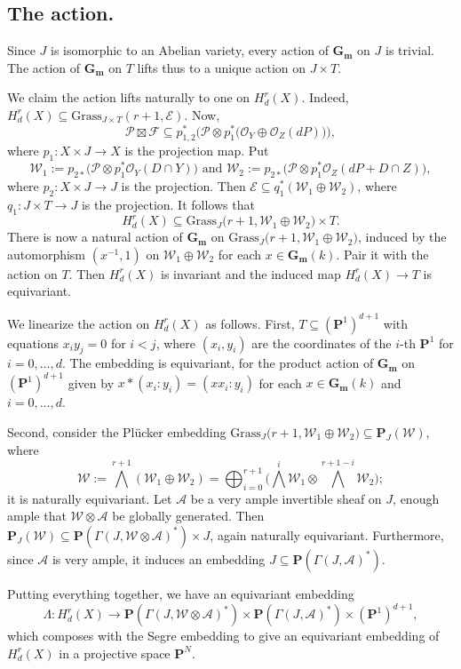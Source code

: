 \documentclass[a4paper,11pt]{amsart}
\theoremstyle{plain}
\theoremstyle{definition}
\theoremstyle{remark}
\def\cc{{\mathbf G}_{\mathbf m}}
\def\P{\mathcal{P}}
\def\W{\mathcal{W}}
\def\IP{{\mathbf P}}
\def\F{\mathcal{F}}
\def\E{\mathcal{E}}
\begin{document}
\subsection{The action.}\label{tG}

Since $J$ is isomorphic to an Abelian variety, every action of $\cc$ on $J$ is trivial. The action of $\cc$ on $T$ lifts thus to a unique action on $J\times T$. 

We claim the action lifts naturally
to one on $H^{r}_d(X)$. Indeed, $H^r_d(X)\subseteq \text{Grass}_{J\times T}(r+1,\E)$. Now,
$$
\P\boxtimes\F\subseteq p_{1,2}^*\Big(\P\otimes p_1^*\big(\mathcal O_Y\oplus\mathcal O_Z(dP)\big)\Big),
$$
where $p_1\colon X\times J\to X$ is the projection map. Put
$$
\W_1:=p_{2\ast}\big(\P\otimes p_1^*\mathcal O_Y(D\cap Y)\big)\text{ and }
\W_2:=p_{2\ast}\big(\P\otimes p_1^*\mathcal O_Z(dP+D\cap Z)\big),
$$
where $p_2\colon X\times J\to J$ is the projection. Then $\mathcal E\subseteq q_1^*(\W_1\oplus\W_2)$, where $q_1\colon J\times T\to J$ is the projection. It follows that 
$$
H^r_d(X)\subseteq \text{Grass}_{J}\big(r+1,\W_1\oplus\W_2\big)\times T.
$$
There is now a natural action of $\cc$ on $\text{Grass}_{J}\big(r+1,\W_1\oplus\W_2\big)$, induced by the automorphism $(x^{-1},1)$ on $\W_1\oplus\W_2$ for each $x\in\cc(k)$. Pair it with the action on $T$. Then $H^r_d(X)$ is invariant and the induced map $H^r_d(X)\to T$ is equivariant. 

We linearize the action on $H^r_d(X)$ as follows. 
First, $T\subseteq(\IP^1)^{d+1}$ with equations $x_iy_j=0$ for $i<j$, where $(x_i,y_i)$ are the coordinates of the $i$-th $\IP^1$ for $i=0,\dots,d$. The embedding is equivariant, for the product action of 
$\cc$ on $(\IP^1)^{d+1}$ given by $x\ast (x_i:y_i)=(xx_i:y_i)$ for each $x\in\cc(k)$ and $i=0,\dots,d$.

Second, consider the Pl\"ucker embedding 
$\text{Grass}_{J}\big(r+1,\W_1\oplus\W_2\big)\subseteq\IP_J(\W)$, where
$$
\W:=\bigwedge^{r+1}(\W_1\oplus\W_2)=\bigoplus_{i=0}^{r+1}\Big(\bigwedge^{i}\W_1\otimes\bigwedge^{r+1-i}\W_2\Big);
$$
it is naturally equivariant. Let $\mathcal A$ be a very ample invertible sheaf on $J$, enough ample that $\W\otimes\mathcal A$ be globally generated. Then 
$\IP_J(\W)\subseteq\IP(\Gamma(J,\W\otimes\mathcal A)^*)\times J$, again naturally equivariant. Furthermore, since $\mathcal A$ is very ample, it induces an embedding $J\subseteq\IP(\Gamma(J,\mathcal A)^*)$. 

Putting everything together, we have an equivariant embedding
$$
\Lambda\colon H^r_d(X)\longrightarrow\IP(\Gamma(J,\W\otimes\mathcal A)^*)\times\IP(\Gamma(J,\mathcal A)^*)\times(\IP^1)^{d+1},
$$
which composes with the Segre embedding to give an equivariant embedding of $H^r_d(X)$ in a projective space $\mathbf P^N$.
\end{document}
